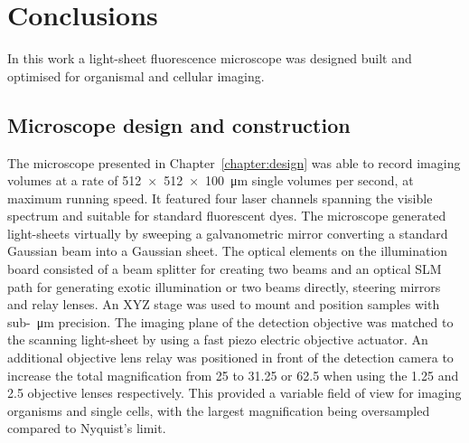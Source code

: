 \ifpdf
    \graphicspath{{Chapters/conclusions/Figs/Raster/}{Chapters/conclusions/Figs/PDF/}{Chapters/conclusions/Figs/}}
\else
    \graphicspath{{Chapters/conclusions/Figs/Vector/}{Chapters/conclusions/Figs/}}
\fi

\chapter{Conclusions}\label{chapter:conclusions} %

In this work a \gls{light-sheet} fluorescence microscope was designed built and optimised for organismal and cellular imaging.

\section{Microscope design and construction}

The microscope presented in Chapter~\ref{chapter:design} was able to record imaging volumes at a rate of \SI{512x512x100}{\micro\meter} single volumes per second, at maximum running speed.
It featured four laser channels spanning the visible spectrum and suitable for standard fluorescent dyes.
The microscope generated light-sheets virtually by sweeping a galvanometric mirror converting a standard Gaussian beam into a Gaussian sheet.
The optical elements on the \gls{illumination board} consisted of a beam splitter for creating two beams and an optical \gls{SLM} path for generating exotic illumination or two beams directly, steering mirrors and relay lenses.
An XYZ stage was used to mount and position samples with sub-\SI{}{\micro\meter} precision.
The imaging plane of the  detection objective was matched to the scanning light-sheet by using a fast piezo electric objective actuator.
An additional objective lens relay was positioned in front of the detection camera to increase the total magnification from \SI{25}{\times} to \SI{31.25}{\times} or \SI{62.5}{\times} when using the \SI{1.25}{\times} and \SI{2.5}{\times} objective lenses respectively.
This provided a variable field of view for imaging organisms and single cells, with the largest magnification being oversampled compared to Nyquist's limit.

